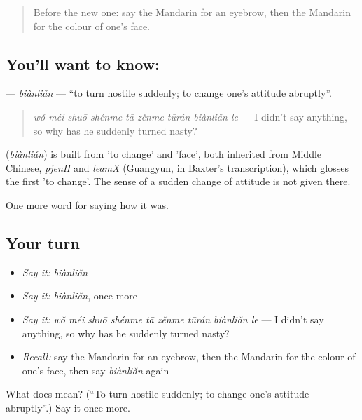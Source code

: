 \label{lesson:ZH-C472-bianlian}



\begin{quote}
Before the new one: say the Mandarin for an eyebrow, then the Mandarin for the colour of one's face.
\end{quote}

\subsection*{You'll want to know: }
\textbf{} — \emph{biànliǎn} — \textquotedblleft{}to turn hostile suddenly; to change one's attitude abruptly\textquotedblright{}.

\begin{quote}
\textbf{} \emph{wǒ méi shuō shénme tā zěnme tūrán biànliǎn le} — I didn't say anything, so why has he suddenly turned nasty?
\end{quote}

\begin{cousinweb}
\textbf{} (\emph{biànliǎn}) is built from  'to change' and  'face', both inherited from Middle Chinese, \emph{pjenH} and \emph{leamX} (Guangyun, in Baxter's transcription), which glosses the first 'to change'. The sense of a sudden change of attitude is not given there.
\end{cousinweb}

\begin{grammarlens}[title={What you've built}]
One more word for saying how it was.
\end{grammarlens}

\subsection*{Your turn}
\begin{itemize}
\raggedright
  \item \emph{Say it:} \emph{biànliǎn}
  \item \emph{Say it:} \emph{biànliǎn}, once more
  \item \emph{Say it:} \emph{wǒ méi shuō shénme tā zěnme tūrán biànliǎn le} — I didn't say anything, so why has he suddenly turned nasty?
  \item \emph{Recall:} say the Mandarin for an eyebrow, then the Mandarin for the colour of one's face, then say \emph{biànliǎn} again
\end{itemize}

\begin{tcolorbox}[breakable,colback=teal!4,colframe=teal!35!black,title={Before you move on}]
What does  mean? (\textquotedblleft{}To turn hostile suddenly; to change one's attitude abruptly\textquotedblright{}.) Say it once more.
\end{tcolorbox}
